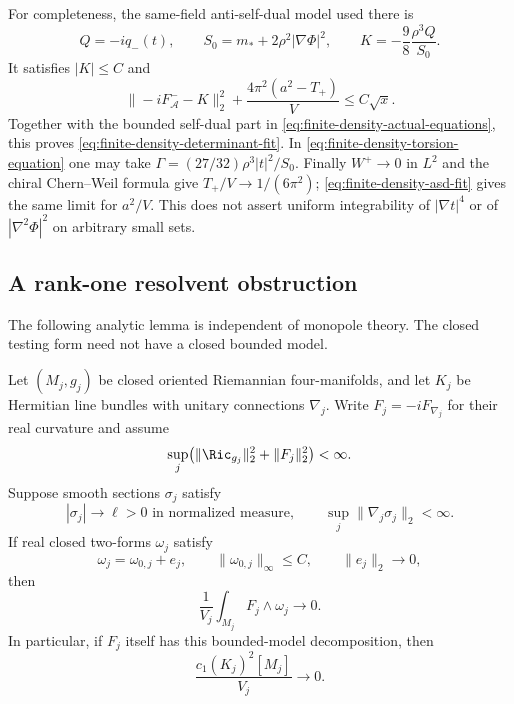 For completeness, the same-field anti-self-dual model used there is
\[
 Q=-iq_-(t),\qquad
 S_0=m_*+2\rho^2|\nabla\Phi|^2,\qquad
 K=-\frac98\frac{\rho^3Q}{S_0}.
\]
It satisfies $|K|\le C$ and
\begin{equation}
 \|-iF_{\mathcal A}^--K\|_2^2
       +\frac{4\pi^2(a^2-T_+)}V\le C\sqrt{x}.
 \label{eq:finite-density-asd-fit}
\end{equation}
Together with the bounded self-dual part in
\eqref{eq:finite-density-actual-equations}, this proves
\eqref{eq:finite-density-determinant-fit}.  In
\eqref{eq:finite-density-torsion-equation} one may take
$\Gamma=(27/32)\rho^3|t|^2/S_0$.  Finally $W^+\to0$ in $L^2$ and
the chiral Chern--Weil formula give $T_+/V\to1/(6\pi^2)$;
\eqref{eq:finite-density-asd-fit} gives the same limit for $a^2/V$.
This does not assert uniform integrability of $|\nabla t|^4$ or of
$|\nabla^2\Phi|^2$ on arbitrary small sets.

\subsection{A rank-one resolvent obstruction}

The following analytic lemma is independent of monopole theory.  The
closed testing form need not have a closed bounded model.

\begin{lemma}
\label{lem:rank-one-logarithmic-resolvent}
Let $(M_j,g_j)$ be closed oriented Riemannian four-manifolds, and let
$K_j$ be Hermitian line bundles with unitary connections $\nabla_j$.
Write $F_j=-iF_{\nabla_j}$ for their real curvature and assume
\[
 \sup_j\bigl(\|\Ric_{g_j}\|_2^2+\|F_j\|_2^2\bigr)<\infty.
\]
Suppose smooth sections $\sigma_j$ satisfy
\[
 |\sigma_j|\longrightarrow\ell>0 \text{ in normalized measure},
 \qquad \sup_j\|\nabla_j\sigma_j\|_2<\infty.
\]
If real closed two-forms $\omega_j$ satisfy
\[
 \omega_j=\omega_{0,j}+e_j,\qquad
 \|\omega_{0,j}\|_\infty\le C,\qquad \|e_j\|_2\longrightarrow0,
\]
then
\begin{equation}
 \frac1{V_j}\int_{M_j}F_j\wedge\omega_j\longrightarrow0.
 \label{eq:finite-density-line-pairing}
\end{equation}
In particular, if $F_j$ itself has this bounded-model decomposition,
then
\begin{equation}
 \frac{c_1(K_j)^2[M_j]}{V_j}\longrightarrow0.
 \label{eq:finite-density-line-square}
\end{equation}
\end{lemma}

